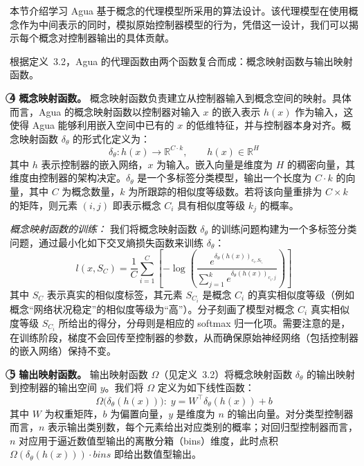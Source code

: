 \documentclass[11pt,a4paper]{article}
\begin{document}
本节介绍学习 Agua 基于概念的代理模型所采用的算法设计。该代理模型在使用概念作为中间表示的同时，模拟原始控制器模型的行为，凭借这一设计，我们可以揭示每个概念对控制器输出的具体贡献。

根据定义~3.2，Agua 的代理函数由两个函数复合而成：概念映射函数与输出映射函数。

\textbf{\textcircled{4} 概念映射函数。} 概念映射函数负责建立从控制器输入到概念空间的映射。具体而言，Agua 的概念映射函数以控制器对输入 $x$ 的嵌入表示 $h(x)$ 作为输入，这使得 Agua 能够利用嵌入空间中已有的 $x$ 的低维特征，并与控制器本身对齐。概念映射函数 $\delta_\theta$ 的形式化定义为：
\begin{equation}
\delta_\theta: h(x)\to\mathbb{R}^{C\cdot k}, \qquad h(x)\in\mathbb{R}^{H}
\label{eq:concept-map}
\end{equation}
其中 $h$ 表示控制器的嵌入网络，$x$ 为输入。嵌入向量是维度为 $H$ 的稠密向量，其维度由控制器的架构决定。$\delta_\theta$ 是一个多标签分类模型，输出一个长度为 $C\cdot k$ 的向量，其中 $C$ 为概念数量，$k$ 为所跟踪的相似度等级数。若将该向量重排为 $C\times k$ 的矩阵，则元素 $(i,j)$ 即表示概念 $C_i$ 具有相似度等级 $k_j$ 的概率。

\emph{概念映射函数的训练：} 我们将概念映射函数 $\delta_\theta$ 的训练问题构建为一个多标签分类问题，通过最小化如下交叉熵损失函数来训练 $\delta_\theta$：
\begin{equation}
l(x,S_C) = \frac{1}{C}\sum_{i=1}^{C}\left[-\log\!\left(\frac{e^{\delta_\theta(h(x))_{c_i,S_{c_i}}}}{\sum_{j=1}^{k} e^{\delta_\theta(h(x))_{c_i,j}}}\right)\right]
\label{eq:ce-loss}
\end{equation}
其中 $S_C$ 表示真实的相似度标签，其元素 $S_{C_i}$ 是概念 $C_i$ 的真实相似度等级（例如概念“网络状况稳定”的相似度等级为“高”）。分子刻画了模型对概念 $C_i$ 真实相似度等级 $S_{C_i}$ 所给出的得分，分母则是相应的 softmax 归一化项。需要注意的是，在训练阶段，梯度不会回传至控制器的参数，从而确保原始神经网络（包括控制器的嵌入网络）保持不变。

\textbf{\textcircled{5} 输出映射函数。} 输出映射函数 $\Omega$（见定义~3.2）将概念映射函数 $\delta_\theta$ 的输出映射到控制器的输出空间 $y$。我们将 $\Omega$ 定义为如下线性函数：
\begin{equation}
\Omega\big(\delta_\theta(h(x))\big):\; y = W^{\top}\delta_\theta(h(x)) + b
\label{eq:output-map}
\end{equation}
其中 $W$ 为权重矩阵，$b$ 为偏置向量，$y$ 是维度为 $n$ 的输出向量。对分类型控制器而言，$n$ 表示输出类别数，每个元素给出对应类别的概率；对回归型控制器而言，$n$ 对应用于逼近数值型输出的离散分箱（bins）维度，此时点积 $\Omega(\delta_\theta(h(x)))\cdot bins$ 即给出数值型输出。
\end{document}
